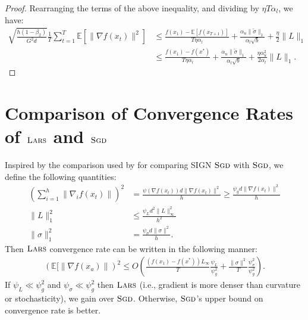 \documentclass{article} \usepackage{iclr2020_conference,times}
\newcommand{\sgd}{\textsc{Sgd}\xspace}
\newcommand{\lars}{\textsc{Lars}}
\begin{document}
\begin{proof}
Rearranging the terms of the above inequality, and dividing by $\eta T \alpha_l$, we have:
\begin{align*}
 \sqrt{\frac{h(1 - \beta_2)}{G^2 d}} \frac{1}{T} \sum_{t=1}^T \mathbb{E}[\|\nabla f(x_t)\|^2] &\leq \frac{f(x_1) - \mathbb{E}[f(x_{T+1})]}{T\eta \alpha_l} + \frac{\alpha_u \|\tilde{\sigma}\|_1}{\alpha_l\sqrt{b}} + \frac{\eta}{2} \| L\|_1 \\
&\leq \frac{f(x_1) - f(x^*)}{T\eta \alpha_l} + \frac{\alpha_u\|\tilde{\sigma}\|_1}{\alpha_l\sqrt{b}} + \frac{\eta \alpha_u^2}{2\alpha_l} \| L\|_1.
\end{align*}
\end{proof}


\section{Comparison of Convergence Rates of $\lars$ and $\sgd$}
\label{sec:conv-compare}

Inspired by the comparison used by \citep{signsgd} for comparing SIGN $\sgd$ with $\sgd$, we define the following quantities:
\begin{align*}
\left(\sum_{i=1}^h \|\nabla_i f(x_t)\|\right)^2 &=  \frac{\psi(\nabla f(x_t))d \|\nabla f(x_t)\|^2}{h} \geq \frac{\psi_g d \|\nabla f(x_t)\|^2}{h} \\
\|L\|_1^2 &\leq  \frac{\psi_L d^2 \|L\|_\infty^2}{h^2} \\
\|\sigma\|_1^2 &=  \frac{\psi_\sigma d \|\sigma\|^2}{h}.
\end{align*}
Then $\lars$ convergence rate can be written in the following manner:
\begin{align*}
\left(\mathbb{E}[\|\nabla f(x_a)\|\right)^2 \leq O\left(\frac{(f(x_1) - f(x^*)) L_\infty}{T}  \frac{\psi_L}{\psi_g^2}+ \frac{\|\sigma \|^2}{T} \frac{\psi_\sigma^2}{\psi_g^2}\right).
\end{align*}
If $\psi_L \ll \psi_g^2$ and $\psi_\sigma \ll \psi_g^2$ then $\lars$ (i.e., gradient is more denser than curvature or stochasticity), we gain over $\sgd$. Otherwise, $\sgd$'s upper bound on convergence rate is better.
\end{document}
